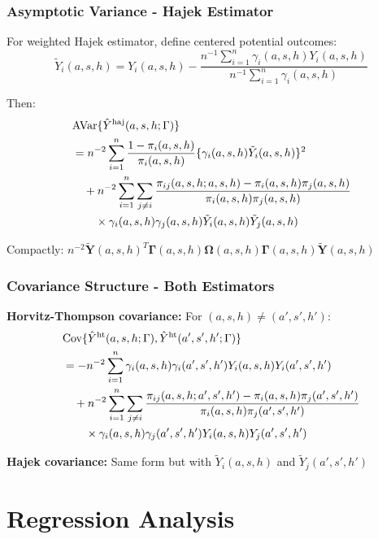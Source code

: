 \documentclass{beamer}
\newcommand{\horthom}{\textup{ht}}
\newcommand{\haj}{\textup{haj}}
\newcommand{\pscore}[1]{\pi_{#1}}
\newcommand{\sumi}{\sum_{i=1}^n}
\newcommand{\bY}{\boldsymbol{Y}}
\newcommand{\bOmega}{\boldsymbol{\Omega}}
\newcommand{\bGamma}{\boldsymbol{\Gamma}}
\begin{document}
\begin{frame}
\frametitle{Asymptotic Variance - Hajek Estimator}
For weighted Hajek estimator, define centered potential outcomes:
$$\tilde{Y}_i(a,s,h) = Y_i(a,s,h) - \frac{n^{-1}\sumi \gamma_i(a,s,h)Y_i(a,s,h)}{n^{-1}\sumi\gamma_i(a,s,h)}$$

\vspace{0.3cm}
Then:
\begin{align}
&\text{AVar}\{\hat{Y}^{\haj}(a,s,h;\Gamma)\} \\
&= n^{-2}\sumi \frac{1-\pscore{i}(a,s,h)}{\pscore{i}(a,s,h)}\{\gamma_i(a,s,h)\tilde{Y}_i(a,s,h)\}^2 \\
&\quad + n^{-2}\sumi\sum_{j\neq i}\frac{\pscore{ij}(a,s,h;a,s,h) - \pscore{i}(a,s,h)\pscore{j}(a,s,h)}{\pscore{i}(a,s,h)\pscore{j}(a,s,h)} \\
&\qquad \times \gamma_i(a,s,h)\gamma_j(a,s,h)\tilde{Y}_i(a,s,h)\tilde{Y}_j(a,s,h)
\end{align}

Compactly: $n^{-2}\tilde{\bY}(a,s,h)^T\bGamma(a,s,h)\bOmega(a,s,h)\bGamma(a,s,h)\tilde{\bY}(a,s,h)$
\end{frame}

\begin{frame}
\frametitle{Covariance Structure - Both Estimators}
\textbf{Horvitz-Thompson covariance:}
For $(a,s,h) \neq (a',s',h')$:
\begin{align}
&\text{Cov}\{\hat{Y}^{\horthom}(a,s,h;\Gamma), \hat{Y}^{\horthom}(a',s',h';\Gamma)\} \\
&= -n^{-2}\sumi \gamma_i(a,s,h)\gamma_i(a',s',h')Y_i(a,s,h)Y_i(a',s',h') \\
&\quad + n^{-2}\sumi\sum_{j\neq i}\frac{\pscore{ij}(a,s,h;a',s',h') - \pscore{i}(a,s,h)\pscore{j}(a',s',h')}{\pscore{i}(a,s,h)\pscore{j}(a',s',h')} \\
&\qquad \times \gamma_i(a,s,h)\gamma_j(a',s',h')Y_i(a,s,h)Y_j(a',s',h')
\end{align}

\textbf{Hajek covariance:} Same form but with $\tilde{Y}_i(a,s,h)$ and $\tilde{Y}_j(a',s',h')$
\end{frame}

\section{Regression Analysis}
\end{document}
